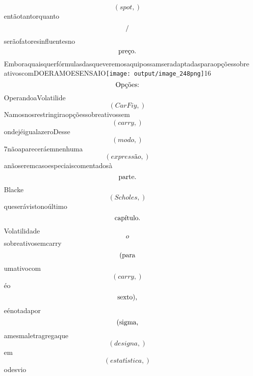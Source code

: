 \documentclass{article}
\begin{document}
\begin{equation}
\left( spot,\right)
\end{equation}entãotantorquanto\begin{equation}
$/$
\end{equation}serãofatoresinfluentesno\begin{equation}
$preço.$
\end{equation}EmboraquaisquerfórmulasdasqueveremosaquipossamseradaptadasparaopçõessobreativoscomDOERAMOESENSAIO\texttt{[image: output/image\_248png]}16\begin{equation}
$Opções:$
\end{equation}OperandoaVolatilide\begin{equation}
\left( CarFiy,\right)
\end{equation}Namosnosrestringiraopçõessobreativossem\begin{equation}
\left( carry,\right)
\end{equation}ondejéigualazeroDesse\begin{equation}
\left( modo,\right)
\end{equation}7nãoapareceráemnenhuma\begin{equation}
\left( expressão,\right)
\end{equation}anãoseremcasoespeciaiscomentadosà\begin{equation}
$parte.$
\end{equation}Blacke\begin{equation}
\left( Scholes,\right)
\end{equation}queserávistonoúltimo\begin{equation}
$capítulo.$
\end{equation}Volatilidade\begin{equation}
o
\end{equation}sobreativosemcarry\begin{equation}
$(para$
\end{equation}umativocom\begin{equation}
\left( carry,\right)
\end{equation}éo\begin{equation}
$sexto),$
\end{equation}eénotadapor\begin{equation}
$(sigma,$
\end{equation}amesmaletragregaque\begin{equation}
\left( designa,\right)
\end{equation}em\begin{equation}
\left( estatística,\right)
\end{equation}odesvio\begin{equation}

\end{equation}
\end{document}
